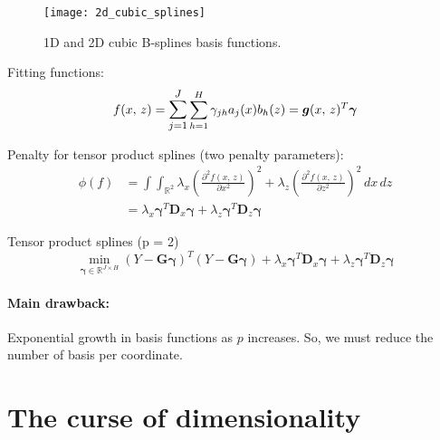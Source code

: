 \begin{figure}[H]
    \texttt{[image: 2d\_cubic\_splines]}
    \caption{1D and 2D cubic B-splines basis functions.}
\end{figure}

Fitting functions:
\begin{equation*}
    f(x,\,z) = \mathlarger{\sum_{j=1}^J} \sum_{h=1}^H \gamma_{jh} a_j(x) b_h(z) = \boldsymbol g(x,\,z)^T \boldsymbol\gamma
\end{equation*}

Penalty for tensor product splines (two penalty parameters):
\begin{align*}
    \phi(f) &= \int \int_{\mathbb R^2}
    \lambda_x \left( \frac{\partial^2 f(x,\,z)}{\partial x^2} \right)^2
    + \lambda_z \left( \frac{\partial^2 f(x,\,z)}{\partial z^2} \right)^2
    \, dx \, dz \\
            &= \lambda_x \boldsymbol \gamma^T \boldsymbol D_x \boldsymbol \gamma
            + \lambda_z \boldsymbol \gamma^T \boldsymbol D_z \boldsymbol \gamma
\end{align*}

\begin{problem}{Tensor product splines (p = 2)}{}
    \begin{equation*}
        \min_{\boldsymbol \gamma \in \mathds R^{J \times H}}
        \left(
            Y - \boldsymbol G\boldsymbol \gamma
        \right)^T
        \left(
            Y - \boldsymbol G\boldsymbol \gamma
        \right)
        + \lambda_x \boldsymbol \gamma^T \boldsymbol D_x \boldsymbol \gamma
        + \lambda_z \boldsymbol \gamma^T \boldsymbol D_z \boldsymbol \gamma
    \end{equation*}
    \tcblower
    \begin{note}
        \paragraph{Main drawback:} Exponential growth in basis functions as $p$ increases.
        So, we must reduce the number of basis per coordinate.
    \end{note}
\end{problem}

\pagebreak
\section{The curse of dimensionality}

